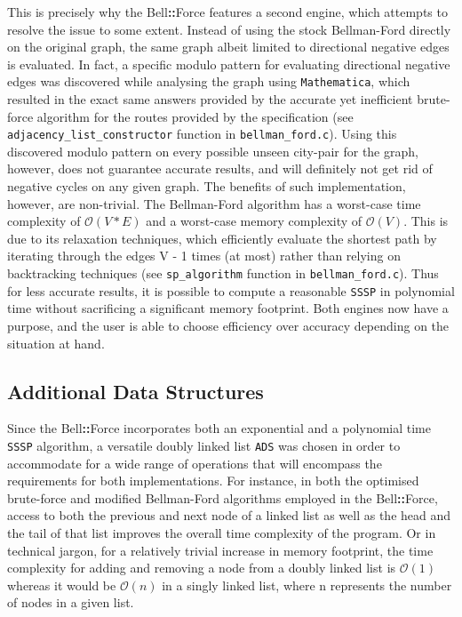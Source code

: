\documentclass[11pt]{article}
\newcommand{\bellforce}{Bell\hspace*{1.61803398875pt}\textbf{::}\hspace*{1.61803398875pt}Force}
\begin{document}
This is precisely why the \bellforce{} features a second engine, which attempts to resolve the issue to some extent. Instead of using the stock Bellman-Ford directly on the original graph, the same graph albeit limited to directional negative edges is evaluated. In fact, a specific modulo pattern for evaluating directional negative edges was discovered while analysing the graph using \texttt{Mathematica}, which resulted in the exact same answers provided by the accurate yet inefficient brute-force algorithm for the routes provided by the specification (see \texttt{adjacency\_list\_constructor} function in \texttt{bellman\_ford.c}). Using this discovered modulo pattern on every possible unseen city-pair for the graph, however, does not guarantee accurate results, and will definitely not get rid of negative cycles on any given graph. The benefits of such implementation, however, are non-trivial. The Bellman-Ford algorithm has a worst-case time complexity of $\mathcal{O}(V * E)$  and a worst-case memory complexity of $\mathcal{O}(V)$\cite{Sedgewick}. This is due to its relaxation techniques, which efficiently evaluate the shortest path by iterating through the edges V - 1 times (at most) rather than relying on backtracking techniques (see \texttt{sp\_algorithm} function in \texttt{bellman\_ford.c}). Thus for less accurate results, it is possible to compute a reasonable \texttt{SSSP} in polynomial time without sacrificing a significant memory footprint. Both engines now have a purpose, and the user is able to choose efficiency over accuracy depending on the situation at hand. 
\subsection{Additional Data Structures}
Since the \bellforce{} incorporates both an exponential and a polynomial time \texttt{SSSP} algorithm, a versatile doubly linked list \texttt{ADS} was chosen in order to accommodate for a wide range of operations that will encompass the requirements for both implementations. For instance, in both the optimised brute-force and modified Bellman-Ford algorithms employed in the \bellforce{}, access to both the previous and next node of a linked list as well as the head and the tail of that list improves the overall time complexity of the program. Or in technical jargon, for a relatively trivial increase in memory footprint, the time complexity for adding and removing a node from a doubly linked list is $\mathcal{O}(1)$ whereas it would be $\mathcal{O}(n)$ in a singly linked list, where n represents the number of nodes in a given list.
\end{document}
